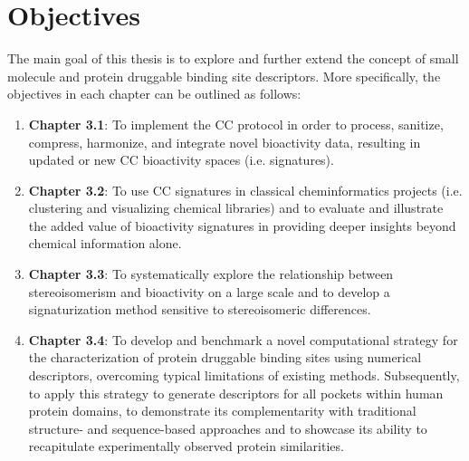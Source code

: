 \chapter{Objectives}
\label{objectives}
\clearpage

The main goal of this thesis is to explore and further extend the concept of small molecule and protein druggable binding site descriptors. More specifically, the objectives in each chapter can be outlined as follows:

\begin{enumerate}

\item \textbf{Chapter 3.1}: To implement the CC protocol in order to process, sanitize, compress, harmonize, and integrate novel bioactivity data, resulting in updated or new CC bioactivity spaces (i.e. signatures). 

\item \textbf{Chapter 3.2}: To use CC signatures in classical cheminformatics projects (i.e. clustering and visualizing chemical libraries) and to evaluate and illustrate the added value of bioactivity signatures in providing deeper insights beyond chemical information alone.

\item \textbf{Chapter 3.3}: To systematically explore the relationship between stereoisomerism and bioactivity on a large scale and to develop a signaturization method sensitive to stereoisomeric differences. 

\item \textbf{Chapter 3.4}: To develop and benchmark a novel computational strategy for the characterization of protein druggable binding sites using numerical descriptors, overcoming typical limitations of existing methods. Subsequently, to apply this strategy to generate descriptors for all pockets within human protein domains, to demonstrate its complementarity with traditional structure- and sequence-based approaches and to showcase its ability to recapitulate experimentally observed protein similarities.

\end{enumerate}